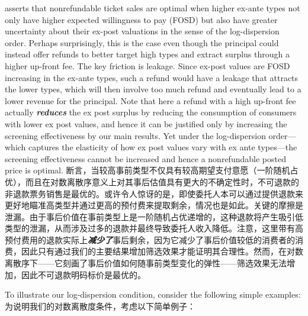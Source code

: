 \documentclass[12pt,letterpaper]{article}
\newenvironment{original}{\color{black}\noindent}{}
\newenvironment{translation}{\color{blue}\noindent}{}
\theoremstyle{plain}
\theoremstyle{definition}
\theoremstyle{remark}
\renewcommand{\1}{\mathds{1}}
\theoremstyle{definition}
\begin{document}
\begin{original}
 asserts that nonrefundable ticket sales are optimal when higher ex-ante types not only have higher expected willingness to pay (FOSD) but also have greater uncertainty about their ex-post valuations in the sense of the log-dispersion order. Perhaps surprisingly, this is the case even though the principal could instead offer refunds to better target high types and extract surplus through a higher up-front fee. The key friction is leakage. Since ex-post values are FOSD increasing in the ex-ante types, such a refund would have a leakage that attracts the lower types, which will then involve too much refund and eventually lead to a lower revenue for the principal. Note that here a refund with a high up-front fee actually \textit{\textbf{reduces}} the ex post surplus by reducing the consumption of consumers with lower ex post values, and hence it can be justified only by increasing the screening effectiveness by our main results. Yet under the log-dispersion order---which captures the elasticity of how ex post values vary with ex ante types---the screening effectiveness cannot be increased and hence a nonrefundable posted price is optimal.
\end{original}
\begin{translation}
断言，当较高事前类型不仅具有较高期望支付意愿（一阶随机占优），而且在对数离散序意义上对其事后估值具有更大的不确定性时，不可退款的非退款票务销售是最优的。或许令人惊讶的是，即使委托人本可以通过提供退款来更好地瞄准高类型并通过更高的预付费来提取剩余，情况也是如此。关键的摩擦是泄漏。由于事后价值在事前类型上是一阶随机占优递增的，这种退款将产生吸引低类型的泄漏，从而涉及过多的退款并最终导致委托人收入降低。注意，这里带有高预付费用的退款实际上\textit{\textbf{减少了}}事后剩余，因为它减少了事后价值较低的消费者的消费，因此只有通过我们的主要结果增加筛选效果才能证明其合理性。然而，在对数离散序下——它刻画了事后价值如何随事前类型变化的弹性——筛选效果无法增加，因此不可退款明码标价是最优的。
\end{translation}

\begin{original}
To illustrate our log-dispersion condition, consider the following simple examples:
\end{original}
\begin{translation}
为说明我们的对数离散度条件，考虑以下简单例子：
\end{translation}
\end{document}
